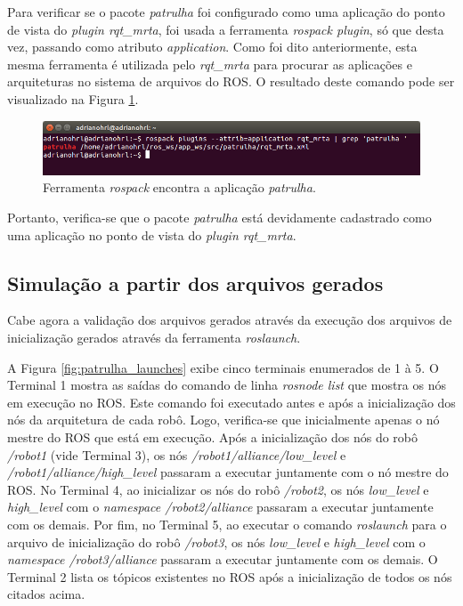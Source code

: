             Para verificar se o pacote \textit{patrulha} foi configurado como uma aplicação do ponto de vista do \textit{plugin rqt\_mrta}, foi usada a ferramenta \textit{rospack plugin}, só que desta vez, passando como atributo \textit{application}. Como foi dito anteriormente, esta mesma ferramenta é utilizada pelo \textit{rqt\_mrta} para procurar as aplicações e arquiteturas no sistema de arquivos do ROS. O resultado deste comando pode ser visualizado na Figura \ref{fig:rospack_patrulha}.
        
            \begin{figure}[htb]
                \centering
                \includegraphics[width=.95\textwidth]{Figuras/4_resultados/rqt_mrta_patrulha.png}
                \caption{Ferramenta \textit{rospack} encontra a aplicação \textit{patrulha}.} \label{fig:rospack_patrulha}
            \end{figure}
            
            Portanto, verifica-se que o pacote \textit{patrulha} está devidamente cadastrado como uma aplicação no ponto de vista do \textit{plugin rqt\_mrta}.
            
        \subsection{Simulação a partir dos arquivos gerados} \label{subsec:sim_patrulha}
            Cabe agora a validação dos arquivos gerados através da execução dos arquivos de inicialização gerados através da ferramenta \textit{roslaunch}. 
            
            A Figura \ref{fig:patrulha_launches} exibe cinco terminais enumerados de 1 à 5. O Terminal 1 mostra as saídas do comando de linha \textit{rosnode list} que mostra os nós em execução no ROS. Este comando foi executado antes e após a inicialização dos nós da arquitetura de cada robô. Logo, verifica-se que inicialmente apenas o nó mestre do ROS que está em execução. Após a inicialização dos nós do robô \textit{/robot1} (vide Terminal 3), os nós \textit{/robot1/alliance/low\_level} e \textit{/robot1/alliance/high\_level} passaram a executar juntamente com o nó mestre do ROS. No Terminal 4, ao inicializar os nós do robô \textit{/robot2}, os nós \textit{low\_level} e \textit{high\_level} com o \textit{namespace /robot2/alliance} passaram a executar juntamente com os demais. Por fim, no Terminal 5, ao executar o comando \textit{roslaunch} para o arquivo de inicialização do robô \textit{/robot3}, os nós \textit{low\_level} e \textit{high\_level} com o \textit{namespace /robot3/alliance} passaram a executar juntamente com os demais. O Terminal 2 lista os tópicos existentes no ROS após a inicialização de todos os nós citados acima.
            
